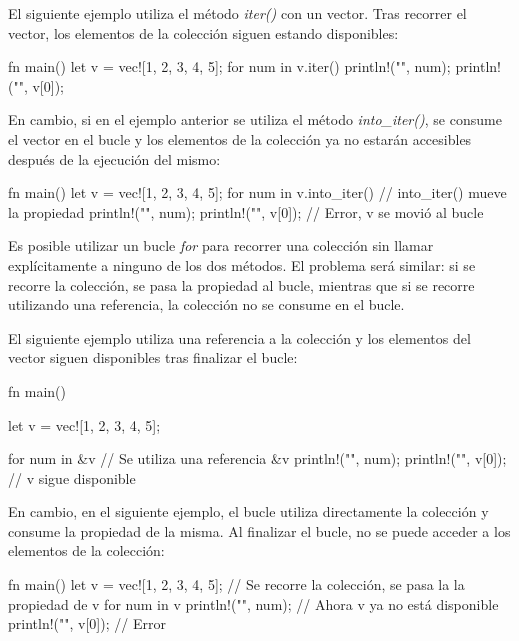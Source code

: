 El siguiente ejemplo utiliza el método \textit{iter()} con un vector. Tras recorrer el vector, los elementos de la colección siguen estando disponibles:

\vspace{0.7em}
\begin{Codigo}
fn main() {
   let v = vec![1, 2, 3, 4, 5];
   for num in v.iter() {
      println!("{}", num);
   }
   println!("{}", v[0]);
}
\end{Codigo}

En cambio, si en el ejemplo anterior se utiliza el método \textit{into\_iter()}, se consume el vector en el bucle y los elementos de la colección ya no estarán accesibles después de la ejecución del mismo:

\vspace{0.7em}
\begin{Codigo}
fn main() {
   let v = vec![1, 2, 3, 4, 5];
   for num in v.into_iter() { // into_iter() mueve la propiedad
      println!("{}", num);
   }
   println!("{}", v[0]); // Error, v se movió al bucle
}
\end{Codigo}

Es posible utilizar un bucle \textit{for} para recorrer una colección sin llamar explícitamente a ninguno de los dos métodos. El problema será similar: si se recorre la colección, se pasa la propiedad al bucle, mientras que si se recorre utilizando una referencia, la colección no se consume en el bucle. 

El siguiente ejemplo utiliza una referencia a la colección y los elementos del vector siguen disponibles tras finalizar el bucle:

\vspace{0.7em}
\begin{Codigo}
fn main() {
   let v = vec![1, 2, 3, 4, 5];  
    
   for num in &v { // Se utiliza una referencia &v
      println!("{}", num);
   }
   println!("{}", v[0]); // v sigue disponible
}
\end{Codigo}

En cambio, en el siguiente ejemplo, el bucle utiliza directamente la colección y consume la propiedad de la misma. Al finalizar el bucle, no se puede acceder a los elementos de la colección:

\vspace{0.7em}
\begin{Codigo}
fn main() {
   let v = vec![1, 2, 3, 4, 5];      
   // Se recorre la colección, se pasa la la propiedad de v 
   for num in v {
      println!("{}", num);
   }
   // Ahora v ya no está disponible
   println!("{}", v[0]); // Error
}
\end{Codigo}

